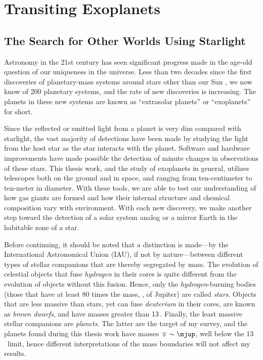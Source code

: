 \chapter[Transiting Exoplanets]%
{%
Transiting Exoplanets}
\label{cha:intro}

\section{The Search for Other Worlds Using Starlight}
\label{cha:intro:sec:search}

Astronomy in the 21st century has seen significant progress made in the age-old question of our uniqueness in the universe.
Less than two decades since the first discoveries of planetary-mass systems around stars other than our Sun \citep{Latham_Stefanik_Mazeh:nat:1989a, Wolszczan_Frail:nat:1992a, Mayor_Queloz:nat:1995a}, we now know of 200 planetary systems, and the rate of new discoveries is increasing.
The planets in these new systems are known as ``extrasolar planets'' or ``exoplanets'' for short.

Since the reflected or emitted light from a planet is very dim compared with starlight, the vast majority of detections have been made by studying the light from the host star as the star interacts with the planet.
Software and hardware improvements have made possible the detection of minute changes in observations of these stars.
This thesis work, and the study of exoplanets in general, utilizes telescopes both on the ground and in space, and ranging from ten-centimeter to ten-meter in diameter.
With these tools, we are able to test our understanding of how gas giants are formed and how their internal structure and chemical composition vary with environment.
With each new discovery, we make another step toward the detection of a solar system analog or a mirror Earth in the habitable zone of a star.

Before continuing, it should be noted that a distinction is made---by the International Astronomical Union (IAU), if not by nature---between different types of stellar companions that are thereby segregated by mass.
The evolution of celestial objects that fuse \textit{hydrogen} in their cores is quite different from the evolution of objects without this fusion.
Hence, only the \textit{hydrogen}-burning bodies (those that have at least 80 times the mass, \mjup, of Jupiter) are called \textit{stars}.
Objects that are less massive than stars, yet can fuse \textit{deuterium} in their cores, are known as {\it brown dwarfs}, and have masses greater than 13\,\mjup.
Finally, the least massive stellar companions are {\it planets}.
The latter are the target of my survey, and the planets found during this thesis work have masses $\mp\sim\mjup$, well below the 13\,\mjup\ limit, hence different interpretations of the mass boundaries will not affect my results.

